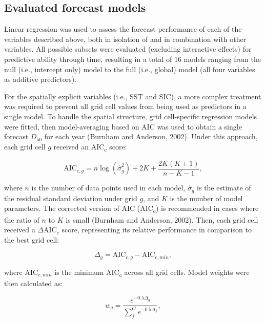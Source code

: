 \documentclass[12pt,]{book}
\theoremstyle{definition}
\theoremstyle{definition}
\theoremstyle{definition}
\theoremstyle{remark}
\begin{document}
\subsection{Evaluated forecast models}\label{rtf-models}

Linear regression was used to assess the forecast performance of each of
the variables described above, both in isolation of and in combination
with other variables. All possible subsets were evaluated (excluding
interactive effects) for predictive ability through time, resulting in a
total of 16 models ranging from the null (i.e., intercept only) model to
the full (i.e., global) model (all four variables as additive
predictors).

For the spatially explicit variables (i.e., SST and SIC), a more complex
treatment was required to prevent all grid cell values from being used
as predictors in a single model. To handle the spatial structure, grid
cell-specific regression models were fitted, then model-averaging based
on AIC was used to obtain a single forecast \(D_{50}\) for each year
(Burnham and Anderson, 2002). Under this approach, each grid cell \(g\)
received an AIC\textsubscript{c} score:

\begin{equation}
  \text{AIC}_{c,g}=n \log{\left(\hat{\sigma}_g^2\right) + 2K + \frac{2K(K+1)}{n-K-1}},
  \label{eq:aicc}
\end{equation}

where \(n\) is the number of data points used in each model,
\(\hat{\sigma}_g\) is the estimate of the residual standard deviation
under grid \(g\), and \(K\) is the number of model parameters. The
corrected version of AIC (AIC\textsubscript{c}) is recommended in cases
where the ratio of \(n\) to \(K\) is small (Burnham and Anderson, 2002).
Then, each grid cell received a \(\Delta\text{AIC}_\text{c}\) score,
representing its relative performance in comparison to the best grid
cell:

\begin{equation}
  \Delta_g=\text{AIC}_{\text{c},g}-\text{AIC}_{\text{c},min},
  \label{eq:delta-aicc}
\end{equation}

where \(\text{AIC}_{\text{c},min}\) is the minimum AIC\textsubscript{c}
across all grid cells. Model weights were then calculated as:

\begin{equation}
  w_g=\frac{e^{-0.5\Delta_g}}{\sum_j^G e^{-0.5\Delta_j}},
\label{eq:aicc-weights}
\end{equation}
\end{document}
